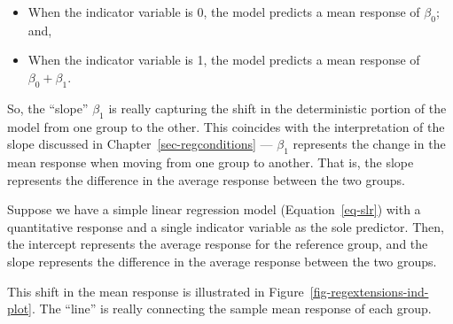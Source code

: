 \documentclass[
  letterpaper,
  DIV=11,
  numbers=noendperiod]{scrreprt}
\providecommand{\tightlist}{%
  \setlength{\itemsep}{0pt}\setlength{\parskip}{0pt}}\usepackage{longtable,booktabs,array}
\theoremstyle{plain}
\theoremstyle{definition}
\theoremstyle{definition}
\theoremstyle{remark}
\begin{document}
\begin{itemize}
\tightlist
\item
  When the indicator variable is 0, the model predicts a mean response
  of \(\beta_0\); and,
\item
  When the indicator variable is 1, the model predicts a mean response
  of \(\beta_0 + \beta_1\).
\end{itemize}

So, the ``slope'' \(\beta_1\) is really capturing the shift in the
deterministic portion of the model from one group to the other. This
coincides with the interpretation of the slope discussed in
Chapter~\ref{sec-regconditions} --- \(\beta_1\) represents the change in
the mean response when moving from one group to another. That is, the
slope represents the difference in the average response between the two
groups.

\begin{tcolorbox}[enhanced jigsaw, breakable, titlerule=0mm, colframe=quarto-callout-note-color-frame, bottomtitle=1mm, opacityback=0, rightrule=.15mm, toptitle=1mm, arc=.35mm, bottomrule=.15mm, left=2mm, title=\textcolor{quarto-callout-note-color}{\faInfo}\hspace{0.5em}{Interpretation of the Parameters}, leftrule=.75mm, coltitle=black, toprule=.15mm, colbacktitle=quarto-callout-note-color!10!white, colback=white, opacitybacktitle=0.6]

Suppose we have a simple linear regression model (Equation~\ref{eq-slr})
with a quantitative response and a single indicator variable as the sole
predictor. Then, the intercept represents the average response for the
reference group, and the slope represents the difference in the average
response between the two groups.

\end{tcolorbox}

This shift in the mean response is illustrated in
Figure~\ref{fig-regextensions-ind-plot}. The ``line'' is really
connecting the sample mean response of each group.
\end{document}
